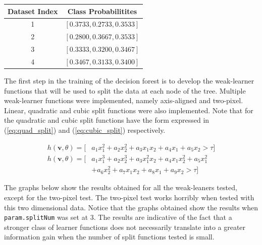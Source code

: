 \documentclass[a4paper,pra,twocolumn,10pt,aps,longbibliography,nobalancelastpage]{revtex4-1}
\begin{document}
\begin{table}[H]
\centering
\begin{tabular}{|c|c|}
\hline
Dataset Index & Class Probabilitites 		\\ \hline
1             & $[0.3733, 0.2733, 0.3533]$  	\\ \hline
2             & $[0.2800, 0.3667, 0.3533]$  	\\ \hline
3             & $[0.3333, 0.3200, 0.3467]$ 	\\ \hline
4             & $[0.3467, 0.3133, 0.3400]$  	\\ \hline
\end{tabular}
\end{table}



The first step in the training of the decision forest is to develop the weak-learner functions that will be used to split the data at each node of the tree. Multiple weak-learner functions were implemented, namely axis-aligned and two-pixel. Linear, quadratic and cubic split functions were also implemented. Note that for the quadratic and cubic split functions have the form expressed in (\ref{eq:quad_split}) and (\ref{eq:cubic_split}) respectively.

\begin{align}
h(\textbf{v}, \theta) = [&a_1x_1^2+a_2x_2^2+a_3x_1x_2+a_4x_1+a_5x_2>\tau] \label{eq:quad_split} \\
h(\textbf{v}, \theta) = [&a_1x_1^3+a_2x_2^3+a_3x_1^2x_2+a_4x_1x_2^2+a_5x_1^2 \nonumber\\
&+a_6x_2^2+a_7x_1x_2+a_8x_1+a_9x_2>\tau] \label{eq:cubic_split}
\end{align}

The graphs below show the results obtained for all the weak-leaners tested, except for the two-pixel test. The two-pixel test works horribly when tested with this two dimensional data. Notice that the graphs obtained show the results when \texttt{param.splitNum} was set at 3. The results are indicative of the fact that a stronger class of learner functions does not necessarily translate into a greater information gain when the number of split functions tested is small.
\end{document}
